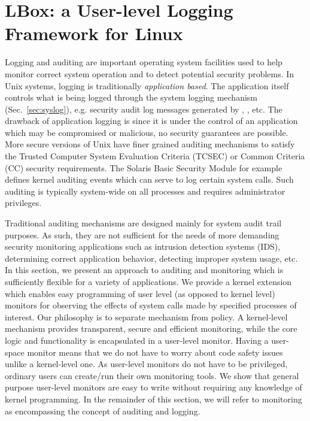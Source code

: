 \section{LBox: a User-level Logging Framework for Linux}
\label{sec:lbox}


Logging and auditing are important operating system facilities used
to help monitor correct system operation and to detect potential
security problems.
In Unix systems, logging is traditionally {\em application based}.
The application itself controls what is being logged through
the system logging mechanism  (Sec.~\ref{sec:syslog}), e.g.
security audit log messages generated 
by , , etc.
The drawback of application logging is since it is under the
control of an application which may be compromised or malicious,
no security guarantees are possible.
More secure versions of Unix have finer grained auditing mechanisms
to satisfy the Trusted Computer System Evaluation Criteria (TCSEC) or Common
Criteria (CC) security requirements.
The Solaris Basic Security Module \cite{solaris-sec-svc}
for example defines kernel auditing events 
which can serve to log certain system calls.
Such auditing is typically system-wide on all processes and
requires administrator privileges.

Traditional auditing mechanisms are designed mainly for
system audit trail purposes.
As such, they are not sufficient for the needs
of more demanding security monitoring applications
such as intrusion detection systems (IDS), 
determining correct application behavior, detecting improper system usage, etc.
In this section, we present an approach to auditing and monitoring
which is sufficiently flexible for a variety of applications.
We provide a kernel extension which enables easy
programming of user level (as opposed to kernel level) monitors for 
observing the effects of system calls made by specified processes of interest.
Our philosophy is to separate mechanism from policy.
A kernel-level mechanism provides transparent, secure and efficient monitoring,
while the core logic and functionality is encapsulated in a user-level monitor.
Having a user-space monitor means that
we do not have to worry about code safety
issues unlike a kernel-level one.
As user-level monitors do not have to be privileged, 
ordinary users can create/run their own monitoring tools.
We show that general purpose user-level monitors are easy to write 
without requiring any knowledge of kernel programming. 
In the remainder of this section, we will refer to monitoring as encompassing
the concept of auditing and logging.

